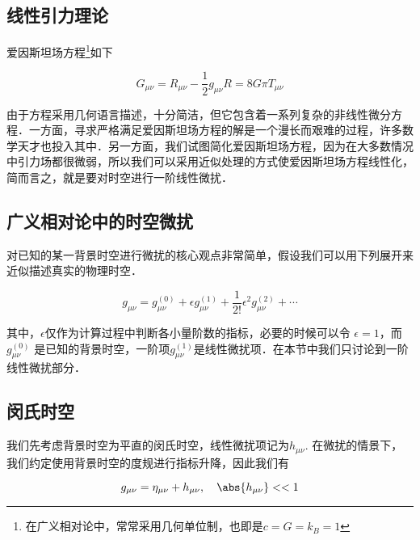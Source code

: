 
\begin{issues}
\issueMissDepend
\issueDraft
\end{issues}



\subsection{线性引力理论}
爱因斯坦场方程\footnote{在广义相对论中，常常采用几何单位制，也即是$c=G=k_B=1$}如下

\begin{equation}
G_{\mu \nu} = R_{\mu \nu} - \frac{1}{2}g_{\mu\nu}R = 8 G\pi T_{\mu\nu}
\end{equation}

由于方程采用几何语言描述，十分简洁，但它包含着一系列复杂的非线性微分方程．一方面，寻求严格满足爱因斯坦场方程的解是一个漫长而艰难的过程，许多数学天才也投入其中．另一方面，我们试图简化爱因斯坦场方程，因为在大多数情况中引力场都很微弱，所以我们可以采用近似处理的方式使爱因斯坦场方程线性化，简而言之，就是要对时空进行一阶线性微扰．


\subsection{广义相对论中的时空微扰}

对已知的某一背景时空进行微扰的核心观点非常简单，假设我们可以用下列展开来近似描述真实的物理时空．

\begin{equation}
g_{\mu\nu}=g^{(0)}_{\mu\nu} + \epsilon g^{(1)}_{\mu\nu} + \frac{1}{2!}\epsilon^2 g^{(2)}_{\mu\nu}+\cdots
\end{equation}

其中，$\epsilon $仅作为计算过程中判断各小量阶数的指标，必要的时候可以令 $\epsilon = 1 $，而$g^{(0)}_{\mu\nu} $ 是已知的背景时空，一阶项$g^{(1)}_{\mu\nu}$是线性微扰项．在本节中我们只讨论到一阶线性微扰部分．


\subsection{闵氏时空}

我们先考虑背景时空为平直的闵氏时空，线性微扰项记为$h_{\mu\nu}$. 在微扰的情景下，我们约定使用背景时空的度规进行指标升降，因此我们有

\begin{equation}
g_{\mu\nu} = \eta_{\mu\nu} + h_{\mu\nu},\quad \abs{h_{\mu\nu}}<<1
\end{equation}

